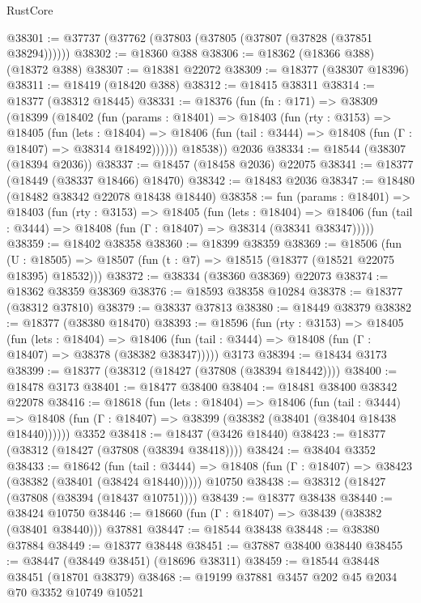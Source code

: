 \begin{lexlean}{RustCore}
\begin{coremodule}
@38301 := @37737 (@37762 (@37803 (@37805 (@37807 (@37828 (@37851 @38294))))))
@38302 := @18360 @388
@38306 := @18362 (@18366 @388) (@18372 @388)
@38307 := @18381 @22072
@38309 := @18377 (@38307 @18396)
@38311 := @18419 (@18420 @388)
@38312 := @18415 @38311
@38314 := @18377 (@38312 @18445)
@38331 := @18376
    (fun (fn : @171) =>
    @38309
      (@18399
        (@18402
          (fun (params : @18401) =>
          @18403
            (fun (rty : @3153) =>
            @18405
              (fun (lets : @18404) =>
              @18406 (fun (tail : @3444) => @18408 (fun (Γ : @18407) => @38314 @18492))))))
        @18538))
    @2036
@38334 := @18544 (@38307 (@18394 @2036))
@38337 := @18457 (@18458 @2036) @22075
@38341 := @18377 (@18449 (@38337 @18466) @18470)
@38342 := @18483 @2036
@38347 := @18480 (@18482 @38342 @22078 @18438 @18440)
@38358 := fun (params : @18401) =>
  @18403
    (fun (rty : @3153) =>
    @18405
      (fun (lets : @18404) =>
      @18406 (fun (tail : @3444) => @18408 (fun (Γ : @18407) => @38314 (@38341 @38347)))))
@38359 := @18402 @38358
@38360 := @18399 @38359
@38369 := @18506
    (fun (U : @18505) => @18507 (fun (t : @7) => @18515 (@18377 (@18521 @22075 @18395) @18532)))
@38372 := @38334 (@38360 @38369) @22073
@38374 := @18362 @38359 @38369
@38376 := @18593 @38358 @10284
@38378 := @18377 (@38312 @37810)
@38379 := @38337 @37813
@38380 := @18449 @38379
@38382 := @18377 (@38380 @18470)
@38393 := @18596
    (fun (rty : @3153) =>
    @18405
      (fun (lets : @18404) =>
      @18406 (fun (tail : @3444) => @18408 (fun (Γ : @18407) => @38378 (@38382 @38347)))))
    @3173
@38394 := @18434 @3173
@38399 := @18377 (@38312 (@18427 (@37808 (@38394 @18442))))
@38400 := @18478 @3173
@38401 := @18477 @38400
@38404 := @18481 @38400 @38342 @22078
@38416 := @18618
    (fun (lets : @18404) =>
    @18406
      (fun (tail : @3444) =>
      @18408 (fun (Γ : @18407) => @38399 (@38382 (@38401 (@38404 @18438 @18440))))))
    @3352
@38418 := @18437 (@3426 @18440)
@38423 := @18377 (@38312 (@18427 (@37808 (@38394 @38418))))
@38424 := @38404 @3352
@38433 := @18642
    (fun (tail : @3444) => @18408 (fun (Γ : @18407) => @38423 (@38382 (@38401 (@38424 @18440)))))
    @10750
@38438 := @38312 (@18427 (@37808 (@38394 (@18437 @10751))))
@38439 := @18377 @38438
@38440 := @38424 @10750
@38446 := @18660 (fun (Γ : @18407) => @38439 (@38382 (@38401 @38440))) @37881
@38447 := @18544 @38438
@38448 := @38380 @37884
@38449 := @18377 @38448
@38451 := @37887 @38400 @38440
@38455 := @38447 (@38449 @38451) (@18696 @38311)
@38459 := @18544 @38448 @38451 (@18701 @38379)
@38468 := @19199 @37881 @3457 @202 @45 @2034 @70 @3352 @10749 @10521

\end{coremodule}
\end{lexlean}
